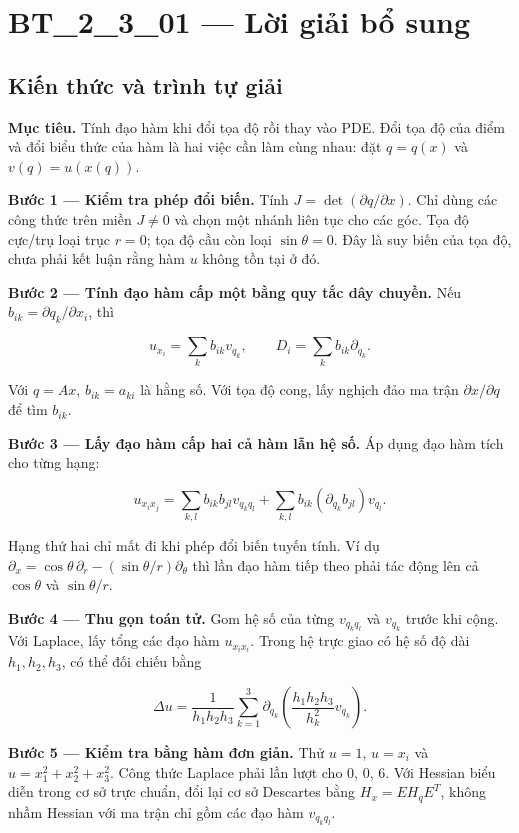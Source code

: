\documentclass[10pt,a4paper]{article}
\begin{document}
\section*{BT\_2\_3\_01 — Lời giải bổ sung}
\subsection*{Kiến thức và trình tự giải}
\textbf{Mục tiêu.} Tính đạo hàm khi đổi tọa độ rồi thay vào PDE. Đổi tọa độ của điểm và đổi biểu thức của hàm là hai việc cần làm cùng nhau: đặt $q=q(x)$ và $v(q)=u(x(q))$.

\textbf{Bước 1 — Kiểm tra phép đổi biến.} Tính $J=\det(\partial q/\partial x)$. Chỉ dùng các công thức trên miền $J\ne0$ và chọn một nhánh liên tục cho các góc. Tọa độ cực/trụ loại trục $r=0$; tọa độ cầu còn loại $\sin\theta=0$. Đây là suy biến của tọa độ, chưa phải kết luận rằng hàm $u$ không tồn tại ở đó.

\textbf{Bước 2 — Tính đạo hàm cấp một bằng quy tắc dây chuyền.} Nếu $b_{ik}=\partial q_k/\partial x_i$, thì


\[
u_{x_i}=\sum_k b_{ik}v_{q_k},\qquad D_i=\sum_k b_{ik}\partial_{q_k}.
\]


Với $q=Ax$, $b_{ik}=a_{ki}$ là hằng số. Với tọa độ cong, lấy nghịch đảo ma trận $\partial x/\partial q$ để tìm $b_{ik}$.

\textbf{Bước 3 — Lấy đạo hàm cấp hai cả hàm lẫn hệ số.} Áp dụng đạo hàm tích cho từng hạng:


\[
u_{x_ix_j}=\sum_{k,l}b_{ik}b_{jl}v_{q_kq_l}
+\sum_{k,l}b_{ik}(\partial_{q_k}b_{jl})v_{q_l}.
\]


Hạng thứ hai chỉ mất đi khi phép đổi biến tuyến tính. Ví dụ $\partial_x=\cos\theta\,\partial_r-(\sin\theta/r)\partial_\theta$ thì lần đạo hàm tiếp theo phải tác động lên cả $\cos\theta$ và $\sin\theta/r$.

\textbf{Bước 4 — Thu gọn toán tử.} Gom hệ số của từng $v_{q_kq_l}$ và $v_{q_k}$ trước khi cộng. Với Laplace, lấy tổng các đạo hàm $u_{x_ix_i}$. Trong hệ trực giao có hệ số độ dài $h_1,h_2,h_3$, có thể đối chiếu bằng


\[
\Delta u=\frac1{h_1h_2h_3}\sum_{k=1}^3
\partial_{q_k}\left(\frac{h_1h_2h_3}{h_k^2}v_{q_k}\right).
\]


\textbf{Bước 5 — Kiểm tra bằng hàm đơn giản.} Thử $u=1$, $u=x_i$ và $u=x_1^2+x_2^2+x_3^2$. Công thức Laplace phải lần lượt cho $0$, $0$, $6$. Với Hessian biểu diễn trong cơ sở trực chuẩn, đổi lại cơ sở Descartes bằng $H_x=E H_q E^T$, không nhầm Hessian với ma trận chỉ gồm các đạo hàm $v_{q_kq_l}$.
\end{document}
